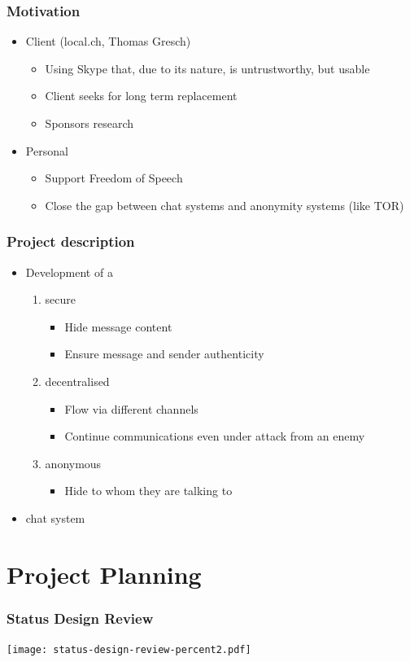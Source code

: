 \documentclass{beamer}
\begin{document}
\frame
{
  \frametitle{Motivation}
  \begin{itemize}
     \item Client (local.ch, Thomas Gresch)
     \begin{itemize}
        \item Using Skype that, due to its nature, is untrustworthy, but usable
        \item Client seeks for long term replacement 
        \item Sponsors research
    \end{itemize}
     \item Personal
     \begin{itemize}
        \item Support Freedom of Speech
        \item Close the gap between chat systems and anonymity systems (like TOR)
    \end{itemize}
  \end{itemize}
}


\frame
{
  \frametitle{Project description}
  \begin{itemize}
  \item Development of a
  \begin{enumerate}
      \item  secure
          \begin{itemize}
          \item Hide message content
          \item Ensure message and sender authenticity
          \end{itemize}
      \item  decentralised
          \begin{itemize}
          \item Flow via different channels
          \item Continue communications even under attack from an enemy
          \end{itemize}
      \item  anonymous
          \begin{itemize}
          \item Hide to whom they are talking to
          \end{itemize}
  \end{enumerate}
  \item chat system
  \end{itemize}
}

\section{Project Planning}
\frame
{
    \frametitle{Status Design Review}
    \begin{center}
    \texttt{[image: status-design-review-percent2.pdf]}
    \end{center}
}
\end{document}
